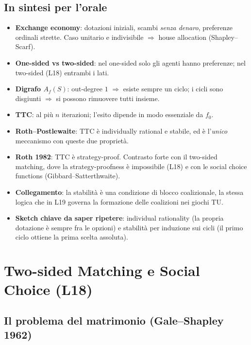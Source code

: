 \documentclass[12pt,a4paper,twoside]{book}
\theoremstyle{plain}
\theoremstyle{definition}
\begin{document}
\section*{In sintesi per l'orale}
\begin{itemize}
  \item \textbf{Exchange economy}: dotazioni iniziali, scambi \emph{senza denaro}, preferenze ordinali strette. Caso unitario e indivisibile $\Rightarrow$ house allocation (Shapley--Scarf).
  \item \textbf{One-sided vs two-sided}: nel one-sided solo gli agenti hanno preferenze; nel two-sided (L18) entrambi i lati.
  \item \textbf{Digrafo $A_f(S)$}: out-degree $1$ $\Rightarrow$ esiste sempre un ciclo; i cicli sono disgiunti $\Rightarrow$ si possono rimuovere tutti insieme.
  \item \textbf{TTC}: al più $n$ iterazioni; l'esito dipende in modo essenziale da $f_0$.
  \item \textbf{Roth--Postlewaite}: TTC è individually rational e stabile, ed è l'\emph{unico} meccanismo con queste due proprietà.
  \item \textbf{Roth 1982}: TTC è strategy-proof. Contrasto forte con il two-sided matching, dove la strategy-proofness è impossibile (L18) e con le social choice functions (Gibbard--Satterthwaite).
  \item \textbf{Collegamento}: la stabilità è una condizione di blocco coalizionale, la stessa logica che in L19 governa la formazione delle coalizioni nei giochi TU.
  \item \textbf{Sketch chiave da saper ripetere}: individual rationality (la propria dotazione è sempre fra le opzioni) e stabilità per induzione sui cicli (il primo ciclo ottiene la prima scelta assoluta).
\end{itemize}

\chapter{Two-sided Matching e Social Choice (L18)}
\label{ch:two-sided}

\section{Il problema del matrimonio (Gale--Shapley 1962)}
\end{document}
